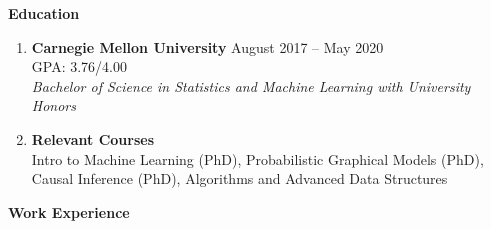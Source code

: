 \documentclass[letterpaper,11pt]{article}
\makeatletter
\newlength{\outerbordwidth}
\newcommand{\resheading}[1]{\vspace{0pt} %
  \parbox{\textwidth}{\setlength{\FrameSep}{\outerbordwidth}
    \begin{shaded}
\setlength{\fboxsep}{0pt}\framebox[\textwidth][l]{\setlength{\fboxsep}{3.5pt}\fcolorbox{shadecolorB}{shadecolorB}{\textbf{\sffamily{\mbox{~}\makebox[7.262in][l]{\large #1} \vphantom{p\^{E}}}}}} %
    \end{shaded}
  }\vspace{-7pt} %
}
\newcommand{\ressubheading}[5]{
\begin{tabular*}{6.8in}{l@{\cftdotfill{\cftsecdotsep}\extracolsep{\fill}}r}
		\textbf{#1} & {#2} \\
		{#3} \\
		\textit{#4} \\
		\textit{#5} \\
\end{tabular*}\vspace{-6pt}}
\makeatother
\begin{document}
\begin{mybox}
	\hspace{-8pt} \textbf{Education}
\end{mybox}


\vspace{-10pt}
\begin{enumerate}[leftmargin=10pt]

	\item[] \textbf{Carnegie Mellon University} \cftdotfill{\cftdotsep} August 2017 -- May 2020\\
	GPA: 3.76/4.00 \\
	\textit{Bachelor of Science in Statistics and Machine Learning with University Honors} \\
	\vspace{-0.3pt}
	\item[] \textbf{Relevant Courses} \\
	Intro to Machine Learning (PhD), Probabilistic Graphical Models (PhD), Causal Inference (PhD), Algorithms and Advanced Data Structures \\
	\vspace{-0.01pt}
	
\end{enumerate}

\vspace{-10pt}

\begin{mybox}
	\hspace{-8pt} \textbf{Work Experience}
\end{mybox}
\end{document}
